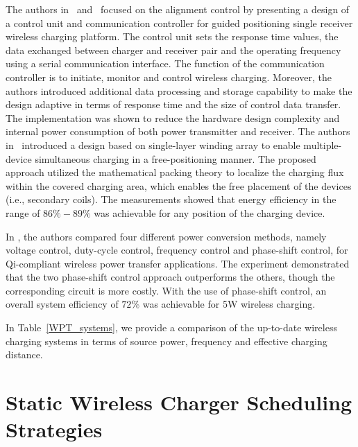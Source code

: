 \documentclass[twocolumn,10pt]{IEEEtran}
\begin{document}
The authors in~\cite{Tiwari2013} and~\cite{X.2011Zhong} focused on the alignment control by presenting a design of a control unit and communication controller for guided positioning single receiver wireless charging platform. The control unit sets the response time values, the data exchanged between charger and receiver pair and the operating frequency using a serial communication interface. The function of the communication controller is to initiate, monitor and control wireless charging. Moreover, the authors introduced additional data processing and storage capability to make the design adaptive in terms of response time and the size of control data transfer. The implementation was shown to reduce the hardware design complexity and internal power consumption of both power transmitter and receiver.
The authors in~\cite{X.2011Zhong} introduced a design based on single-layer winding array to enable multiple-device simultaneous charging in a free-positioning manner. The proposed approach utilized the mathematical packing theory to localize the charging flux within the covered charging area, which enables the free placement of the devices (i.e., secondary coils). The measurements showed that energy efficiency in the range of $86\%-89\%$ was achievable for any position of the charging device. 
 
In \cite{P.2010Choi}, the authors compared four different power conversion methods, namely voltage control, duty-cycle control, frequency control and phase-shift control, for Qi-compliant wireless power transfer applications. The experiment demonstrated that the two phase-shift control approach outperforms the others, though the corresponding circuit is more costly. With the use of phase-shift control, an overall system efficiency of $72\%$ was achievable for 5W wireless charging. 
                                                                                           
 

In Table~\ref{WPT_systems}, we provide a comparison of the up-to-date wireless charging systems in terms of source power, frequency and effective charging distance.



\section{Static Wireless Charger Scheduling Strategies}
\end{document}
